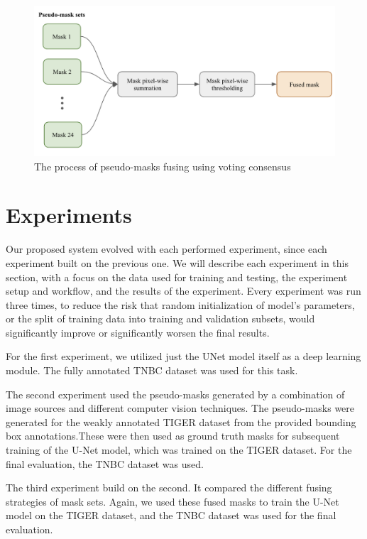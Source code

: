 \begin{figure}[H]
\begin{centering}
\includegraphics[width=\textwidth]{assets/images/for_presentation/dg-mask-fuse-1.png}
\par\end{centering}
\caption{The process of pseudo-masks fusing using voting consensus 
\label{fig:dg-mask-fuse-1}}
\end{figure}

\section{Experiments}
\label{section:experiments}
Our proposed system evolved with each performed experiment, since each experiment built on the previous one. We will describe each experiment in this section, with a focus on the data used for training and testing, the experiment setup and workflow, and the results of the experiment. Every experiment was run three times, to reduce the risk that random initialization of model's parameters, or the split of training data into training and validation subsets, would significantly improve or significantly worsen the final results.

For the first experiment, we utilized just the UNet model itself as a deep learning module. The fully annotated TNBC dataset was used for this task.

The second experiment used the pseudo-masks generated by a combination of image sources and different computer vision techniques. The pseudo-masks were generated for the weakly annotated TIGER dataset from the provided bounding box annotations.These were then used as ground truth masks for subsequent training of the U-Net model, which was trained on the TIGER dataset. For the final evaluation, the TNBC dataset was used.

The third experiment build on the second. It compared the different fusing strategies of mask sets. Again, we used these fused masks to train the U-Net model on the TIGER dataset, and the TNBC dataset was used for the final evaluation.

